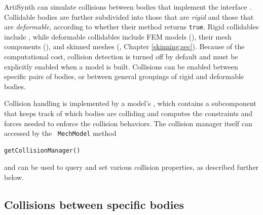ArtiSynth can simulate collisions between bodies that implement the
interface .
Collidable bodies are further subdivided into those that are {\it
rigid} and those that are {\it deformable}, according to whether their
method returns {\tt true}. Rigid collidables include
, while deformable
collidables include FEM models 
(),
their mesh components
(),
and skinned meshes 
(,
Chapter \ref{skinning:sec}).
Because of the computational cost,
collision detection is turned off by default and must be explicitly
enabled when a model is built.  Collisions can be enabled between
specific pairs of bodies, or between general groupings of rigid and
deformable bodies.

Collision handling is implemented by a model's
, which
contains a 
subcomponent that keeps track of which bodies are colliding and
computes the constraints and forces needed to enforce the collision
behaviors. The collision manager itself can accessed by the {\tt
MechModel} method
%
\begin{lstlisting}[]
  getCollisionManager()
\end{lstlisting}
%
and can be used to query and set various collision properties, as
described further below.

\subsection{Collisions between specific bodies}
\label{specificCollisions:sec}

